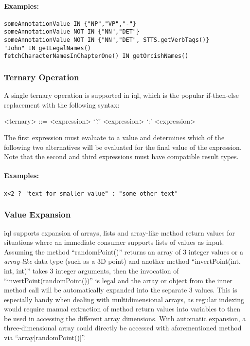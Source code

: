 \documentclass[11pt,a4paper]{article}
\begin{document}
\paragraph{Examples:}

\begin{Verbatim}[samepage=true]
someAnnotationValue IN {"NP","VP","-"}
someAnnotationValue NOT IN {"NN","DET"}
someAnnotationValue NOT IN {"NN","DET", STTS.getVerbTags()}
"John" IN getLegalNames()
fetchCharacterNamesInChapterOne() IN getOrcishNames()
\end{Verbatim}

\subsubsection{Ternary Operation}
\label{sec:ternary-operation}

A single ternary operation is supported in \ac{iql}, which is the popular if-then-else replacement with the following syntax:

\begin{gram}
	\label{gram:ternary-operations}
	\begin{grammar}	
		<ternary> ::= <expression> `?' <expression> `:' <expression>
	\end{grammar}
\end{gram}

\noindent The first expression must evaluate to a  value and determines which of the following two alternatives will be evaluated for the final value of the expression. Note that the second and third expressions must have compatible result types.

\paragraph{Examples:}

\begin{Verbatim}[samepage=true]
x<2 ? "text for smaller value" : "some other text"
\end{Verbatim}

\subsubsection{Value Expansion}
\label{sec:value-expansion}

\ac{iql} supports expansion of arrays, lists and array-like method return values for situations where an immediate consumer supports lists of values as input. Assuming the method ``randomPoint()'' returns an array of 3 integer values or a \textit{array-like} data type (such as a 3D point) and another method ``invertPoint(int, int, int)'' takes 3 integer arguments, then the invocation of ``invertPoint(randomPoint())'' is legal and the array or object from the inner method call will be automatically expanded into the separate 3 values. This is especially handy when dealing with multidimensional arrays, as regular indexing would require manual extraction of method return values into variables to then be used in accessing the different array dimensions. With automatic expansion, a three-dimensional array could directly be accessed with aforementioned method via ``array[randomPoint()]''.
\end{document}
